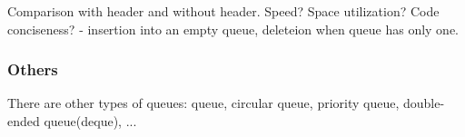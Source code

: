 \begin{section}
Comparison with header and without header.
Speed? Space utilization? Code conciseness? - insertion into an empty queue, deleteion when queue has only one.

\subsubsection*{Others}

There are other types of queues: queue, circular queue, priority queue, double-ended queue(deque), ...

\bigskip
\end{section}
